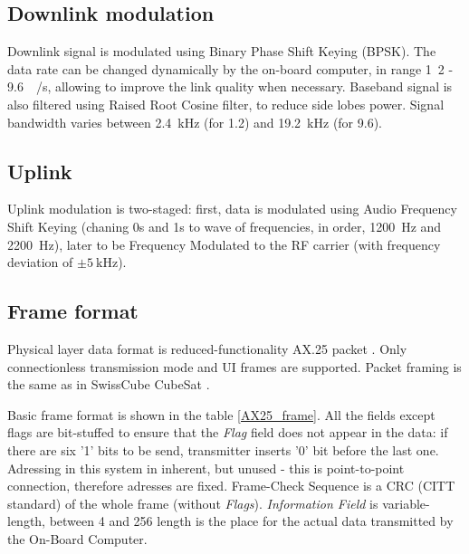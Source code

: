 \subsection{Downlink modulation}
Downlink signal is modulated using Binary Phase Shift Keying (BPSK). The data rate can be changed dynamically by the on-board computer, in range \si{1.2} - \SI{9.6}{\kilo\bit / \second}, allowing to improve the link quality when necessary. Baseband signal is also filtered using Raised Root Cosine filter, to reduce side lobes power. Signal bandwidth varies between \SI{2.4}{\kHz} (for \SI{1.2}{\kbps}) and \SI{19.2}{\kHz} (for \SI{9.6}{\kbps}). 


\subsection{Uplink}
Uplink modulation is two-staged: first, data is modulated using Audio Frequency Shift Keying (chaning 0s and 1s to wave of frequencies, in order, \SI{1200}{\hertz} and \SI{2200}{\hertz}), later to be Frequency Modulated to the RF carrier (with frequency deviation of $\pm\SI{5}{\kilo\hertz}$).


\subsection{Frame format}
Physical layer data format is reduced-functionality AX.25 packet \cite{AX25_standard}. Only connectionless transmission mode and UI frames are supported. Packet framing is the same as in SwissCube CubeSat \cite{SwissCube_AX25}.

Basic frame format is shown in the table \ref{AX25_frame}. All the fields except flags are bit-stuffed to ensure that the \textit{Flag} field does not appear in the data: if there are six '1' bits to be send, transmitter inserts '0' bit before the last one. Adressing in this system in inherent, but unused - this is point-to-point connection, therefore adresses are fixed. Frame-Check Sequence is a CRC (CITT standard) of the whole frame (without \textit{Flags}). \textit{Information Field} is variable-length, between \si{4} and \SI{256}{\byte} length is the place for the actual data transmitted by the On-Board Computer.

